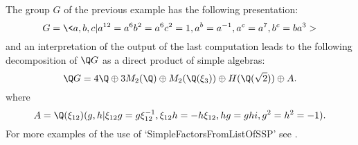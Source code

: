 The group $G$ of the previous example has the following presentation:
    $$G=\<a,b,c|a^{12}=a^6b^2=a^6c^2=1,a^b=a^{-1},a^c=a^7,b^c=ba^3>$$
and an interpretation of the output of the last computation leads to the following 
decomposition of $\Q G$ as a direct product of simple algebras:
    $$\Q G = 4\Q \oplus 3M_2(\Q)\oplus M_2(\Q(\xi_3)) \oplus H(\Q(\sqrt{2})) \oplus A.$$
where
    $$A=\Q(\xi_{12})(g,h|\xi_{12}g=g\xi_{12}^{-1},\xi_{12}h=-h\xi_{12},hg=ghi,g^2=h^2=-1).$$
For more examples of the use of `SimpleFactorsFromListOfSSP' see 
\cite{OR}.
